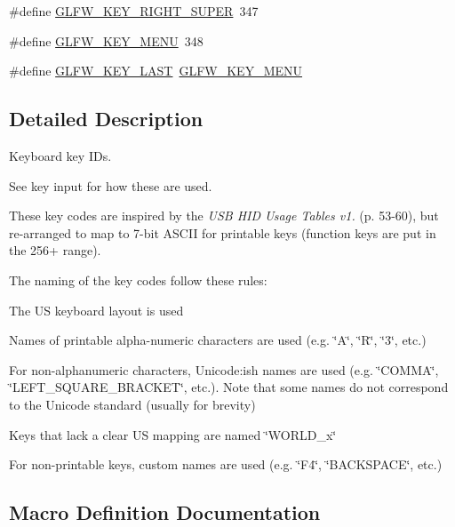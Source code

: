 \begin{DoxyCompactItemize}
\item 
\#define \mbox{\hyperlink{group__keys_gad4547a3e8e247594acb60423fe6502db}{G\+L\+F\+W\+\_\+\+K\+E\+Y\+\_\+\+R\+I\+G\+H\+T\+\_\+\+S\+U\+P\+ER}}~347
\item 
\#define \mbox{\hyperlink{group__keys_ga9845be48a745fc232045c9ec174d8820}{G\+L\+F\+W\+\_\+\+K\+E\+Y\+\_\+\+M\+E\+NU}}~348
\item 
\#define \mbox{\hyperlink{group__keys_ga442cbaef7bfb9a4ba13594dd7fbf2789}{G\+L\+F\+W\+\_\+\+K\+E\+Y\+\_\+\+L\+A\+ST}}~\mbox{\hyperlink{group__keys_ga9845be48a745fc232045c9ec174d8820}{G\+L\+F\+W\+\_\+\+K\+E\+Y\+\_\+\+M\+E\+NU}}
\end{DoxyCompactItemize}


\subsection{Detailed Description}
Keyboard key I\+Ds. 

See key input for how these are used.

These key codes are inspired by the {\itshape U\+SB H\+ID Usage Tables v1.} (p. 53-\/60), but re-\/arranged to map to 7-\/bit A\+S\+C\+II for printable keys (function keys are put in the 256+ range).

The naming of the key codes follow these rules\+:
\begin{DoxyItemize}
\item The US keyboard layout is used
\item Names of printable alpha-\/numeric characters are used (e.\+g. \char`\"{}\+A\char`\"{}, \char`\"{}\+R\char`\"{}, \char`\"{}3\char`\"{}, etc.)
\item For non-\/alphanumeric characters, Unicode\+:ish names are used (e.\+g. \char`\"{}\+C\+O\+M\+M\+A\char`\"{}, \char`\"{}\+L\+E\+F\+T\+\_\+\+S\+Q\+U\+A\+R\+E\+\_\+\+B\+R\+A\+C\+K\+E\+T\char`\"{}, etc.). Note that some names do not correspond to the Unicode standard (usually for brevity)
\item Keys that lack a clear US mapping are named \char`\"{}\+W\+O\+R\+L\+D\+\_\+x\char`\"{}
\item For non-\/printable keys, custom names are used (e.\+g. \char`\"{}\+F4\char`\"{}, \char`\"{}\+B\+A\+C\+K\+S\+P\+A\+C\+E\char`\"{}, etc.) 
\end{DoxyItemize}

\subsection{Macro Definition Documentation}
\mbox{\label{group__keys_ga50391730e9d7112ad4fd42d0bd1597c1}} 

